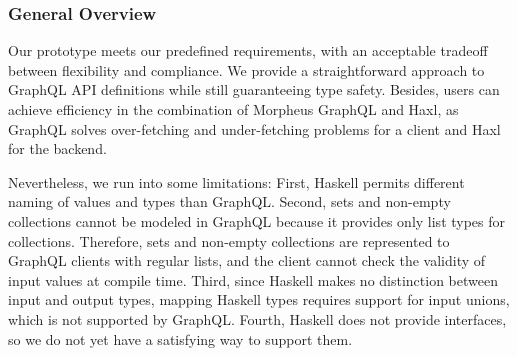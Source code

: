 \begin{frame}\frametitle{General Overview}

Our prototype meets our predefined requirements, with an acceptable tradeoff between flexibility and compliance. We provide a straightforward approach to GraphQL API definitions while still guaranteeing type safety. Besides, users can achieve efficiency in the combination of Morpheus GraphQL and Haxl, as GraphQL solves over-fetching and under-fetching problems for a client and  Haxl for the backend.

Nevertheless, we run into some limitations: First, Haskell permits different naming of values and types than GraphQL. Second, sets and non-empty collections cannot be modeled in GraphQL because it provides only list types for collections. Therefore, sets and non-empty collections are represented to GraphQL clients with regular lists, and the client cannot check the validity of input values at compile time. Third, since Haskell makes no distinction between input and output types, mapping Haskell types requires support for input unions, which is not supported by GraphQL. Fourth, Haskell does not provide interfaces, so we do not yet have a satisfying way to support them. 
\end{frame}
